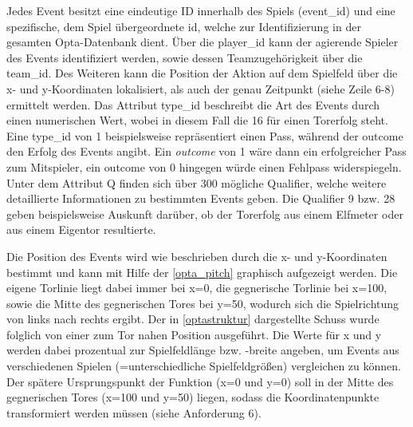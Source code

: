 Jedes Event besitzt eine eindeutige ID innerhalb des Spiels (\textsf{\glqq event\_id\grqq}) und eine spezifische, dem Spiel übergeordnete \textsf{\glqq id\grqq}, welche zur Identifizierung in der gesamten Opta-Datenbank dient. Über die \textsf{\glqq player\_id\grqq} kann der agierende Spieler des Events identifiziert werden, sowie dessen Teamzugehörigkeit über die \textsf{\glqq team\_id\grqq}. Des Weiteren kann die Position der Aktion auf dem Spielfeld über die \textsf{\glqq x\grqq}- und \textsf{\glqq y\grqq}-Koordinaten lokalisiert, als auch der genau Zeitpunkt (siehe Zeile 6-8) ermittelt werden. Das Attribut \textsf{\glqq type\_id\grqq} beschreibt die Art des Events durch einen numerischen Wert, wobei in diesem Fall die \textsf{16} für einen Torerfolg steht. Eine \textsf{\glqq type\_id\grqq} von \textsf{1} beispielsweise repräsentiert einen Pass, während der \textsf{\glqq outcome\grqq} den Erfolg des Events angibt. Ein \textit{\glqq outcome\grqq} von \textsf{1} wäre dann ein erfolgreicher Pass zum Mitspieler, ein \textsf{\glqq outcome\grqq} von \textsf{0} hingegen würde einen Fehlpass widerspiegeln. Unter dem Attribut \textsf{\glqq Q\grqq} finden sich über 300 mögliche Qualifier, welche weitere detaillierte Informationen zu bestimmten Events geben. Die Qualifier \textsf{9} bzw. \textsf{28} geben beispielsweise Auskunft darüber, ob der Torerfolg aus einem Elfmeter oder aus einem Eigentor resultierte.
\enlargethispage{2\baselineskip} 

Die Position des Events wird wie beschrieben durch die \textsf{\glqq x\grqq}- und \textsf{\glqq y\grqq}-Koordinaten bestimmt und kann mit Hilfe der \vref{opta_pitch} graphisch aufgezeigt werden. Die eigene Torlinie liegt dabei immer bei \textsf{x=0}, die gegnerische Torlinie bei \textsf{x=100}, sowie die Mitte des gegnerischen Tores bei \textsf{y=50}, wodurch sich die Spielrichtung von links nach rechts ergibt. Der in \vref{optastruktur} dargestellte Schuss wurde folglich von einer zum Tor nahen Position ausgeführt. Die Werte für x und y werden dabei prozentual zur Spielfeldlänge bzw. -breite angeben, um Events aus verschiedenen Spielen (=unterschiedliche Spielfeldgrößen) vergleichen zu können. Der spätere Ursprungspunkt der Funktion (\textsf{x=0} und \textsf{y=0}) soll in der Mitte des gegnerischen Tores (\textsf{x=100} und \textsf{y=50}) liegen, sodass die Koordinatenpunkte transformiert werden müssen (siehe Anforderung 6).

